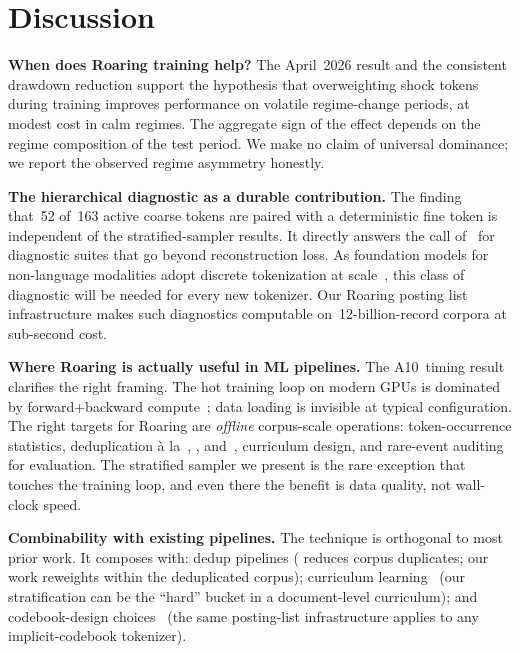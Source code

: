 \documentclass[10pt]{article}
\begin{document}
\section{Discussion}\label{sec:discussion}

\textbf{When does Roaring training help?} The April~2026 result and
the consistent drawdown reduction support the hypothesis that
overweighting shock tokens during training improves performance on
volatile regime-change periods, at modest cost in calm regimes. The
aggregate sign of the effect depends on the regime composition of
the test period. We make no claim of universal dominance; we report
the observed regime asymmetry honestly.

\textbf{The hierarchical diagnostic as a durable contribution.} The
finding that~52 of~163 active coarse tokens are paired with a
deterministic fine token is independent of the stratified-sampler
results. It directly answers the call
of~\citet{shrinks_codebook2026} for diagnostic suites that go beyond
reconstruction loss. As foundation models for non-language
modalities adopt discrete tokenization at scale~\citep{lfq2024,
bsq2024, rvq_audio2024, kronos2025}, this class of diagnostic will be
needed for every new tokenizer. Our Roaring posting list
infrastructure makes such diagnostics computable on~12-billion-record
corpora at sub-second cost.

\textbf{Where Roaring is actually useful in ML pipelines.} The
A10~timing result clarifies the right framing. The hot training
loop on modern GPUs is dominated by forward+backward
compute~\citep{megascale2024}; data loading is invisible at typical
configuration. The right targets for Roaring are \emph{offline}
corpus-scale operations: token-occurrence statistics, deduplication
\`{a} la~\citet{lshbloom2024}, \citet{dolma2024},
and~\citet{lee2022dedup}, curriculum design, and rare-event auditing
for evaluation. The stratified sampler we present is the rare
exception that touches the training loop, and even there the
benefit is data quality, not wall-clock speed.

\textbf{Combinability with existing pipelines.} The technique is
orthogonal to most prior work. It composes with: dedup pipelines
(\citealp{lshbloom2024} reduces corpus duplicates; our work reweights
within the deduplicated corpus); curriculum
learning~\citep{curriculum_llm2025} (our stratification can be the
``hard'' bucket in a document-level curriculum); and codebook-design
choices~\citep{fsq2024, lfq2024} (the same posting-list
infrastructure applies to any implicit-codebook tokenizer).
\end{document}
